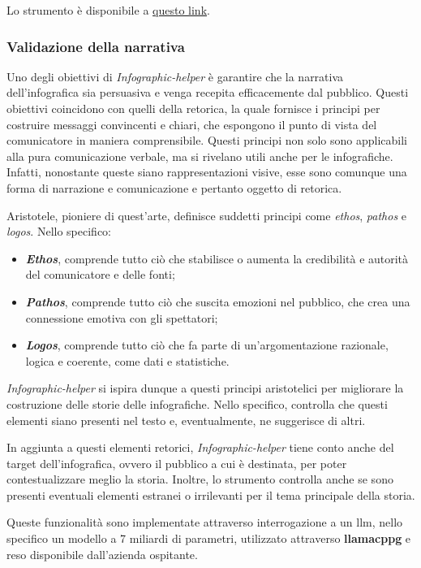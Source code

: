 Lo strumento è disponibile a \href{http://www.overleaf.com}{questo link}.

\subsubsection{Validazione della narrativa}
Uno degli obiettivi di \emph{Infographic-helper} è garantire che la narrativa dell'infografica sia persuasiva e venga recepita efficacemente dal pubblico. 
Questi obiettivi coincidono con quelli della retorica, la quale fornisce i principi per costruire messaggi convincenti e chiari, che espongono il punto di vista del comunicatore in maniera comprensibile. 
Questi principi non solo sono applicabili alla pura comunicazione verbale, ma si rivelano utili anche per le infografiche. 
Infatti, nonostante queste siano rappresentazioni visive, esse sono comunque una forma di narrazione e comunicazione e pertanto oggetto di retorica. 

Aristotele, pioniere di quest'arte, definisce suddetti principi come \emph{ethos}, \emph{pathos} e \emph{logos}. Nello specifico:
\begin{itemize}
    \item \textbf{\emph{Ethos}}, comprende tutto ciò che stabilisce o aumenta la credibilità e autorità del comunicatore e delle fonti;
    \item \textbf{\emph{Pathos}}, comprende tutto ciò che suscita emozioni nel pubblico, che crea una connessione emotiva con gli spettatori;
    \item \textbf{\emph{Logos}}, comprende tutto ciò che fa parte di un'argomentazione razionale, logica e coerente, come dati e statistiche.
\end{itemize}
\emph{Infographic-helper} si ispira dunque a questi principi aristotelici per migliorare la costruzione delle storie delle infografiche. Nello specifico, controlla che questi elementi siano presenti
nel testo e, eventualmente, ne suggerisce di altri.

In aggiunta a questi elementi retorici, \emph{Infographic-helper} tiene conto anche del target dell'infografica, ovvero il pubblico a cui è destinata, per poter contestualizzare meglio la storia. 
Inoltre, lo strumento controlla anche se sono presenti eventuali elementi estranei o irrilevanti per il tema principale della storia. 

\bigskip
\noindent Queste funzionalità sono implementate attraverso interrogazione a un \gls{llm}, nello specifico un modello a 7 miliardi di parametri, utilizzato attraverso \textbf{\gls{llamacppg}} e reso disponibile dall'azienda ospitante.

